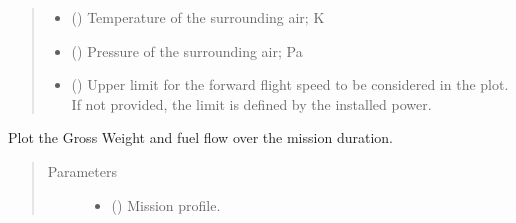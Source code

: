\documentclass[letterpaper,10pt,english]{sphinxmanual}
\begin{document}
\begin{fulllineitems}
\begin{fulllineitems}
\begin{quote}
\begin{description}
\begin{itemize}
\item {} 
\sphinxAtStartPar
{} () \textendash{} Temperature of the surrounding air; K

\item {} 
\sphinxAtStartPar
{} () \textendash{} Pressure of the surrounding air; Pa

\item {} 
\sphinxAtStartPar
{} (\sphinxstyleliteralemphasis{\sphinxupquote{, }}) \textendash{} Upper limit for the forward flight speed to be considered in the
plot. If not provided, the limit is defined by the installed power.

\end{itemize}

\end{description}\end{quote}

\end{fulllineitems}


\begin{fulllineitems}
\label{\detokenize{modules/helicopter:helicopter.Helicopter.plot_gross_weight_over_time}}
\sphinxAtStartPar
Plot the Gross Weight and fuel flow over the mission duration.
\begin{quote}\begin{description}
\item[{Parameters}] \leavevmode\begin{itemize}
\item {} 
\sphinxAtStartPar
{} ({\hyperref[\detokenize{modules/mission:mission.Mission}]{}}) \textendash{} Mission profile.


\end{itemize}
\end{description}
\end{quote}
\end{fulllineitems}
\end{fulllineitems}
\end{document}
